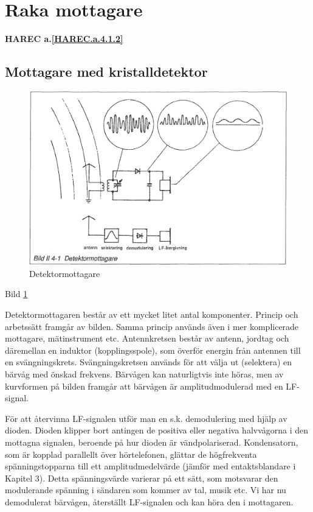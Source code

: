 \section{Raka mottagare}
\textbf{HAREC a.\ref{HAREC.a.4.1.2}\label{myHAREC.a.4.1.2}}

\subsection{Mottagare med kristalldetektor}

\begin{figure}
  \includegraphics[width=\textwidth]{images/bild_2_4-01}
  \caption{Detektormottagare}
  \label{fig:bildII4-1}
\end{figure}

Bild \ref{fig:bildII4-1}

Detektormottagaren består av ett mycket litet antal
komponenter. Princip och arbetssätt framgår av bilden. Samma princip
används även i mer komplicerade mottagare, mätinstrument
etc. Antennkretsen består av antenn, jordtag och däremellan en
induktor (kopplingsspole), som överför energin från antennen till en
svängningskrets. Svängningskretsen används för att välja ut (selektera)
en bärvåg med önskad frekvens. Bärvågen kan naturligtvis inte
höras, men av kurvformen på bilden framgår att bärvågen är
amplitudmodulerad med en LF-signal.

För att återvinna LF-signalen utför man en s.k. demodulering med hjälp
av dioden. Dioden klipper bort antingen de positiva eller negativa
halvvågorna i den mottagna signalen, beroende på hur dioden är
vändpolariserad. Kondensatorn, som är kopplad parallellt över
hörtelefonen, glättar de högfrekventa spänningstopparna till ett
amplitudmedelvärde (jämför med entaktsblandare i Kapitel 3). Detta
spänningsvärde varierar på ett sätt, som motsvarar den modulerande
spänning i sändaren som kommer av tal, musik etc. Vi har nu
demodulerat bärvågen, återställt LF-signalen och kan höra den i
mottagaren.

